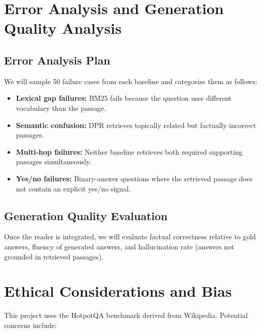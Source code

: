 \documentclass[12pt,a4paper]{article}
\begin{document}
\section{Error Analysis and Generation Quality Analysis}

\subsection*{Error Analysis Plan}

We will sample 50 failure cases from each baseline and categorize them as follows:

\begin{itemize}[noitemsep]
    \item \textbf{Lexical gap failures:} BM25 fails because the question uses different
          vocabulary than the passage.
    \item \textbf{Semantic confusion:} DPR retrieves topically related but factually
          incorrect passages.
    \item \textbf{Multi-hop failures:} Neither baseline retrieves both required supporting
          passages simultaneously.
    \item \textbf{Yes/no failures:} Binary-answer questions where the retrieved passage
          does not contain an explicit yes/no signal.
\end{itemize}

\subsection*{Generation Quality Evaluation}

Once the reader is integrated, we will evaluate
factual correctness relative to gold answers, fluency of generated answers, and
hallucination rate (answers not grounded in retrieved passages).

\section{Ethical Considerations and Bias}

This project uses the HotpotQA benchmark derived from Wikipedia. Potential concerns
include:
\end{document}
